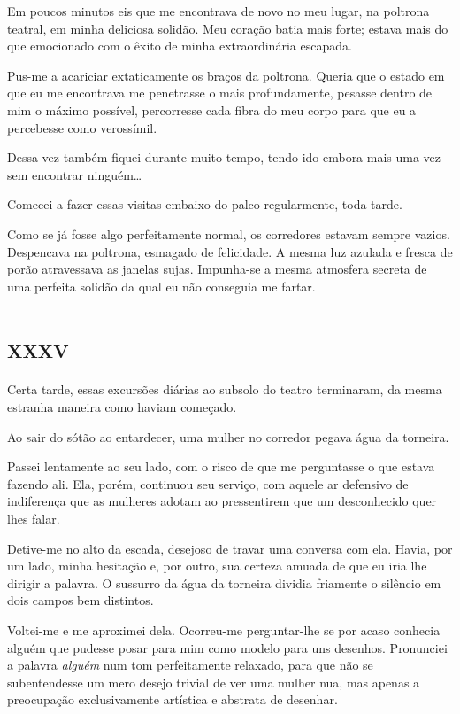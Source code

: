 Em poucos minutos eis que me encontrava de novo no meu lugar, na poltrona teatral, em minha deliciosa solidão. Meu coração batia mais forte; estava mais do que emocionado com o êxito de minha extraordinária escapada.

Pus-me a acariciar extaticamente os braços da poltrona. Queria que o estado em que eu me encontrava me penetrasse o mais profundamente, pesasse dentro de mim o máximo possível, percorresse cada fibra do meu corpo para que eu a percebesse como verossímil.

Dessa vez também fiquei durante muito tempo, tendo ido embora mais uma vez sem encontrar ninguém\ldots

Comecei a fazer essas visitas embaixo do palco regularmente, toda tarde.

Como se já fosse algo perfeitamente normal, os corredores estavam sempre vazios. Despencava na poltrona, esmagado de felicidade. A mesma luz azulada e fresca de porão atravessava as janelas sujas. Impunha-se a mesma atmosfera secreta de uma perfeita solidão da qual eu não conseguia me fartar.


\chapter*{\huge\centering\textsc{xxxv}}

Certa tarde, essas excursões diárias ao subsolo do teatro terminaram, da mesma estranha maneira como haviam começado.

Ao sair do sótão ao entardecer, uma mulher no corredor pegava água da torneira.

Passei lentamente ao seu lado, com o risco de que me perguntasse o que estava fazendo ali. Ela, porém, continuou seu serviço, com aquele ar defensivo de indiferença que as mulheres adotam ao pressentirem que um desconhecido quer lhes falar.

Detive-me no alto da escada, desejoso de travar uma conversa com ela. Havia, por um lado, minha hesitação e, por outro, sua certeza amuada de que eu iria lhe dirigir a palavra. O sussurro da água da torneira dividia friamente o silêncio em dois campos bem distintos.

Voltei-me e me aproximei dela. Ocorreu-me perguntar-lhe se por acaso conhecia alguém que pudesse posar para mim como modelo para uns desenhos. Pronunciei a palavra \textit{alguém} num tom perfeitamente relaxado, para que não se subentendesse um mero desejo trivial de ver uma mulher nua, mas apenas a preocupação exclusivamente artística e abstrata de desenhar.

